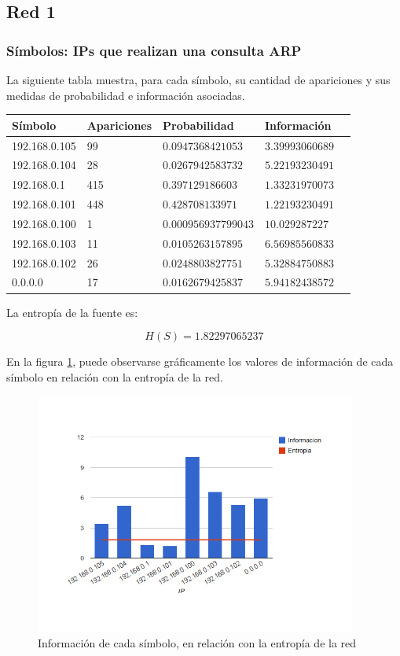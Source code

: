 \documentclass{article}
\begin{document}
\subsection{Red 1}
\subsubsection{Símbolos: IPs que realizan una consulta ARP}
La siguiente tabla muestra, para cada símbolo, su cantidad de apariciones y
sus medidas de probabilidad e información asociadas.

\vskip10pt

\begin{tabular}{|l|l|l|l|l|}
  \hline
  Símbolo & Apariciones & Probabilidad & Información \\
  \hline
  192.168.0.105 & 99 & $0.0947368421053$ & $3.39993060689$ \\
  \hline
  192.168.0.104 & 28 & $0.0267942583732$ & $5.22193230491$ \\
  \hline
  192.168.0.1 & 415 & $0.397129186603$  & $1.33231970073$ \\
  \hline
  192.168.0.101 & 448 & $0.428708133971$ & $1.22193230491$ \\
  \hline
  192.168.0.100 & 1 & $0.000956937799043$ & $10.029287227$ \\
  \hline
  192.168.0.103 & 11 & $0.0105263157895$ & $6.56985560833$ \\
  \hline
  192.168.0.102 & 26 & $0.0248803827751$ & $5.32884750883$ \\
  \hline
  0.0.0.0 & 17 & $0.0162679425837$ & $5.94182438572$ \\
  \hline
\end{tabular}

\vskip10pt

La entropía de la fuente es:

$$H(S) = 1.82297065237$$

En la figura \ref{fig:red1requesters:infoentro}, puede observarse gráficamente
los valores de información de cada símbolo en relación con la entropía de la
red.

\begin{figure}[h!]
    \centering                                                       
    \includegraphics[width=300pt]{consultas1.png}
    \caption{Información de cada símbolo, en relación con la
        entropía de la red}
    \label{fig:red1requesters:infoentro}
\end{figure}
\end{document}

